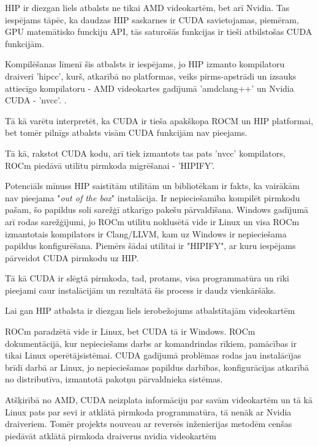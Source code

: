 \documentclass[12pt]{report}%
\theoremstyle{definition}
\begin{document}
HIP ir diezgan liels atbalsts ne tikai AMD videokartēm, bet arī Nvidia. Tas iespējams tāpēc, ka 
daudzas HIP saskarnes ir CUDA savietojamas, piemēram, GPU matemātisko funckiju API, tās saturošās funkcijas
ir tieši atbilstošas CUDA funkcijām.\cite{HIP_math_API,CUDA_math_API}

Kompilēšanas līmenī šis atbalsts ir iespējams, jo HIP izmanto kompilatoru draiveri 'hipcc', kurš,
atkarībā no platformas, veiks pirms-apstrādi un izsauks attiecīgo kompilatoru -
AMD videokartes gadījumā 'amdclang++' un Nvidia CUDA - 'nvcc'. \cite{HIP_compilers}.

Tā kā varētu interpretēt, ka CUDA ir tieša apakškopa ROCM un HIP platformai, bet tomēr pilnīgs atbalsts
visām CUDA funkcijām nav pieejams.



Tā kā, rakstot CUDA kodu, arī tiek izmantots tas pats 'nvcc' kompilators, ROCm piedāvā utilītu
pirmkoda migrēšanai - 'HIPIFY'. \cite{HIPIFY_github}

Potenciāls mīnuss HIP saistītām utilītām un bibliotēkam ir fakts, ka vairākām nav pieejama
"\textit{out of the box}" instalācija. Ir nepieciešamība kompilēt pirmkodu pašam, šo papildus soli
sarežģī atkarīgo pakešu pārvaldīšana. Windows gadījumā arī rodas sarežģījumi, jo ROCm utilītu noklusētā vide
ir Linux un visa ROCm izmantotais kompilators ir Clang/LLVM, kam uz Windows ir nepieciešama papildus 
konfigurēšana.
Piemērs šādai utilītai ir "HIPIFY", ar kuru iespējams pārveidot CUDA pirmkodu uz HIP. \cite{HIPIFY_github}

Tā kā CUDA ir slēgtā pirmkoda, tad, protams, visa programmatūra un rīki pieejami caur instalācijām un
rezultātā šis process ir daudz vienkāršāks.

Lai gan HIP atbalsta ir diezgan liels ierobežojums atbalstītajām videokartēm




ROCm paradzētā vide ir Linux, bet CUDA tā ir Windows. ROCm dokumentācijā, kur nepieciešams darbs ar komandrindas rīkiem, pamācības ir tikai Linux operētājsistēmai. CUDA gadījumā problēmas rodas jau instalācījas brīdī darbā ar Linux, jo nepieciešamas papildus darbības, konfigurācijas atkarībā no distributīva, izmantotā pakotņu pārvaldnieka sistēmas.

Atšķirībā no AMD, CUDA neizplata informāciju par savām videokartēm un tā kā Linux pats par sevi ir atklātā
pirmkoda programmatūra, tā nenāk ar Nvidia draiveriem. Tomēr projekts nouveau ar reversēs inženierijas
metodēm cenšas piedāvāt atklātā pirmkoda draiverus nvidia videokartēm
\end{document}

